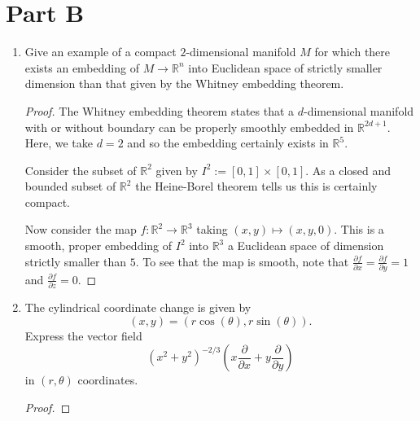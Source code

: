 \documentclass{article}
\begin{document}
\section*{Part B}
\begin{enumerate}
	\item Give an example of a compact $2$-dimensional manifold $M$ for which there exists an embedding of $M \rightarrow \mathbb{R}^n$ into Euclidean space of strictly smaller dimension than that given by the Whitney embedding theorem.
	
	\begin{proof}
		The Whitney embedding theorem states that a $d$-dimensional manifold with or without boundary can be properly smoothly embedded in $\mathbb{R}^{2d+1}$. Here, we take $d=2$ and so the embedding certainly exists in $\mathbb{R}^5$.
		
		Consider the subset of $\mathbb{R}^2$ given by $I^2:=[0,1]\times [0,1]$. 
		As a closed and bounded subset of $\mathbb{R}^2$ the Heine-Borel theorem tells us this is certainly compact. 
		
		Now consider the map $f: \mathbb{R}^2 \rightarrow \mathbb{R}^3$ taking $(x,y) \mapsto (x,y,0)$. 
		This is a smooth, proper embedding of $I^2$ into $\mathbb{R}^3$ a Euclidean space of dimension strictly smaller than $5$.
		To see that the map is smooth, note that $\frac{\partial f}{\partial x} = \frac{\partial f}{\partial y} = 1$ and $\frac{\partial f}{\partial z} = 0$.
	\end{proof}
	
	
	\item The cylindrical coordinate change is given by \[(x,y) = ( r \cos (\theta), r \sin (\theta)).\]
	Express the vector field \[(x^2+y^2)^{-2/3} \left ( x \frac{\partial}{\partial x} + y \frac{\partial}{\partial y} \right) \]
	in $(r,\theta)$ coordinates.
	
	
	\begin{proof}


\end{proof}
\end{enumerate}
\end{document}
